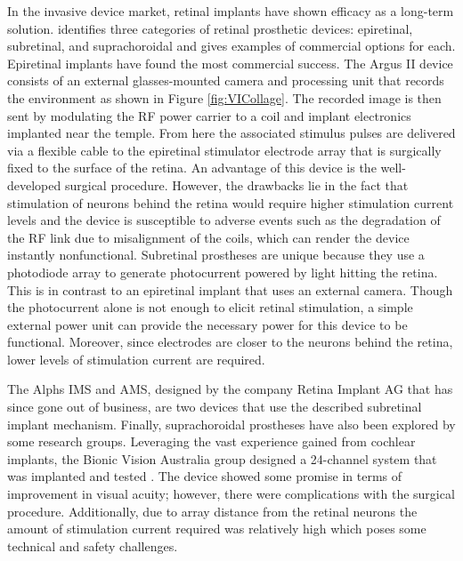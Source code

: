 In the invasive device market, retinal implants have shown efficacy as a long-term solution. \textcite{bloch_advances_2019} identifies three categories of retinal prosthetic devices: epiretinal, subretinal, and suprachoroidal and gives examples of commercial options for each. Epiretinal implants have found the most commercial success. The Argus II device \parencite{SecondSightMedical} consists of an external glasses-mounted camera and processing unit that records the environment as shown in Figure \ref{fig:VICollage}. The recorded image is then sent by modulating the RF power carrier to a coil and implant electronics implanted near the temple. From here the associated stimulus pulses are delivered via a flexible cable to the epiretinal stimulator electrode array that is surgically fixed to the surface of the retina. An advantage of this device is the well-developed surgical procedure. However, the drawbacks lie in the fact that stimulation of neurons behind the retina would require higher stimulation current levels and the device is susceptible to adverse events such as the degradation of the RF link due to misalignment of the coils, which can render the device instantly nonfunctional. Subretinal prostheses are unique because they use a photodiode array to generate photocurrent powered by light hitting the retina. This is in contrast to an epiretinal implant that uses an external camera. Though the photocurrent alone is not enough to elicit retinal stimulation, a simple external power unit can provide the necessary power for this device to be functional. Moreover, since electrodes are closer to the neurons behind the retina, lower levels of stimulation current are required.  

The Alphs IMS and AMS, designed by the company Retina Implant AG that has since gone out of business, are two devices that use the described subretinal implant mechanism. Finally, suprachoroidal prostheses have also been explored by some research groups. Leveraging the vast experience gained from cochlear implants, the Bionic Vision Australia group designed a 24-channel system that was implanted and tested \parencite{BionicVision}. The device showed some promise in terms of improvement in visual acuity; however, there were complications with the surgical procedure. Additionally, due to array distance from the retinal neurons the amount of stimulation current required was relatively high which poses some technical and safety challenges. 

